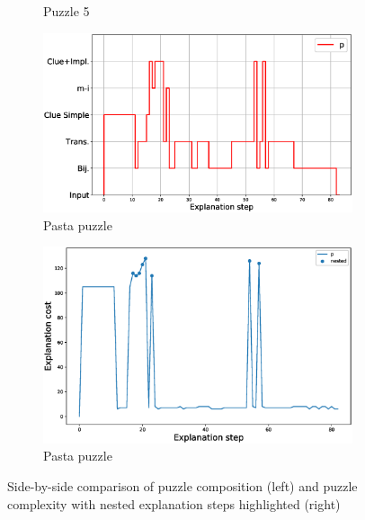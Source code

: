 \begin{figure}
\begin{subfigure}{.5\textwidth}
		\caption{Puzzle 5 }
		\label{fig:cost_puzzle:p5}
	\end{subfigure}
	\begin{subfigure}{.5\textwidth}
		\centering
		\includegraphics[width=0.9\linewidth]{figures/plot_cost_steps_p.eps}
		\caption{Pasta puzzle}
		\label{fig:composition_puzzle:pasta}
	\end{subfigure}%
	\begin{subfigure}{.5\textwidth}
		\centering
		\includegraphics[width=0.84\linewidth]{figures/p.eps}
		\caption{Pasta puzzle}
		\label{fig:cost_puzzle:pasta}
	\end{subfigure}
	\caption{Side-by-side comparison of puzzle composition (left) and puzzle complexity with nested explanation steps highlighted (right)}
	\label{fig:steps}
\end{figure}
